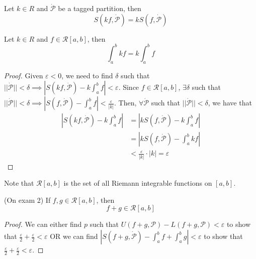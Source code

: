 \begin{lemma}
    Let $k \in R$ and $\dot{\mathcal{P}}$ be a tagged partition, then $$S(kf, \dot{\mathcal{P}}) = kS(f, \dot{\mathcal{P}})$$
\end{lemma}
\begin{theorem}
    Let $k \in R$ and $f \in \mathcal{R}[a, b]$, then $$\int_a^b kf = k \int_a^b f$$
\end{theorem}
\begin{proof}
    Given $\varepsilon < 0$, we need to find $\delta$ such that $||\dot{\mathcal{P}}|| < \delta \implies |S(kf, \dot{\mathcal{P}}) - k \int_a^b f| < \varepsilon$. Since $f \in \mathcal{R}[a, b]$, $\exists \delta$ such that $||\dot{\mathcal{P}}|| < \delta \implies |S(f, \dot{\mathcal{P}}) - \int_a^b f| < \frac{\varepsilon}{|k|}$. Then, $\forall \dot{\mathcal{P}}$ such that $||\dot{\mathcal{P}}|| < \delta$, we have that
    \begin{align*}
        \left|S(kf, \dot{\mathcal{P}}) - k \int_a^b f\right| &= \left|kS(f, \dot{\mathcal{P}}) - k \int_a^b f\right| \\
        &= \left|kS(f, \dot{\mathcal{P}}) - \int_a^b kf\right| \\
        &< \frac{\varepsilon}{|k|} \cdot |k| = \varepsilon
    \end{align*}
\end{proof}
\begin{remark}
    Note that $\mathcal{R}[a, b]$ is the set of all Riemann integrable functions on $[a, b]$.
\end{remark}

\begin{theorem}
    (On exam 2) If $f, g \in \mathcal{R}[a, b]$, then $$f + g \in \mathcal{R}[a, b]$$
\end{theorem}
\begin{proof}
    We can either find $p$ such that $U(f + g, \mathcal{P}) - L(f + g, \mathcal{P}) < \varepsilon$ to show that $\frac{\varepsilon}{2} + \frac{\varepsilon}{2} < \varepsilon$ OR we can find $|S(f + g, \dot{\mathcal{P}}) - \int_a^b f + \int_a^b g| < \varepsilon$ to show that $\frac{\varepsilon}{2} + \frac{\varepsilon}{2} < \varepsilon$.
\end{proof}